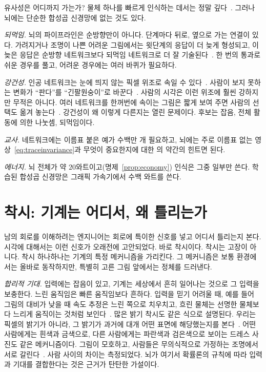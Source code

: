 유사성은 어디까지 가는가? 물체 하나를 빠르게 인식하는 데서는 정말 깊다~\cite{Yamins2014}. 그러나 뇌에는 단순한 합성곱 신경망에 없는 것도 있다.

\emph{되먹임.} 뇌의 파이프라인은 순방향만이 아니다. 단계마다 뒤로, 옆으로 가는 연결이 있다. 가려지거나 조명이 나쁜 어려운 그림에서는 윗단계의 응답이 더 늦게 형성되고, 이 늦은 응답은 순방향 네트워크보다 되먹임 네트워크로 더 잘 기술된다~\cite{Kar2019}. 한 번의 통과로 쉬운 경우를 풀고, 어려운 경우에는 여러 바퀴가 필요하다.

\emph{강건성.} 인공 네트워크는 눈에 띄지 않는 픽셀 위조로 속일 수 있다~\cite{Szegedy2014}. 사람이 보지 못하는 변화가 “판다”를 “긴팔원숭이”로 바꾼다~\cite{Goodfellow2015}. 사람의 시각은 이런 위조에 훨씬 강하지만 무적은 아니다. 여러 네트워크를 한꺼번에 속이는 그림은 짧게 보여 주면 사람의 선택도 옮겨 놓는다~\cite{Elsayed2018}. 강건성이 왜 이렇게 다른지는 열린 문제이다. 후보는 잡음, 전체 활동에 의한 나눗셈, 되먹임이다.

\emph{교사.} 네트워크에는 이름표 붙은 예가 수백만 개 필요하고, 뇌에는 주로 이름표 없는 영상~\eqref{eq:traceinvariance}과 무엇이 중요한지에 대한 의 약간의 힌트면 된다.

\emph{에너지.} 뇌 전체가 약 $20$와트이고(명제~\ref{prop:economy}) 인식은 그중 일부만 쓴다. 학습된 합성곱 신경망은 그래픽 가속기에서 수백 와트를 쓴다.

\section{착시: 기계는 어디서, 왜 틀리는가}
\label{sec:illusions}

남의 회로를 이해하려는 엔지니어는 회로에 특이한 신호를 넣고 어디서 틀리는지 본다. 시각에 대해서는 이런 신호가 오래전에 고안되었다. 바로 착시이다. 착시는 고장이 아니다. 착시 하나하나는 기계의 특정 메커니즘을 가리킨다. 그 메커니즘은 보통 환경에서는 올바로 동작하지만, 특별히 고른 그림 앞에서는 정체를 드러낸다.

\emph{합리적 기대.} 입력에는 잡음이 있고, 기계는 세상에서 흔히 일어나는 것으로 그 입력을 보충한다. 느린 움직임은 빠른 움직임보다 흔하다. 입력을 믿기 어려울 때, 예를 들어 그림의 대비가 낮을 때 속도 추정은 느린 쪽으로 치우치고, 흐린 물체는 선명한 물체보다 느리게 움직이는 것처럼 보인다~\cite{Weiss2002}. 많은 밝기 착시도 같은 식으로 설명된다. 우리는 픽셀의 밝기가 아니라, 그 밝기가 과거에 대개 어떤 표면에 해당했는지를 본다~\cite{Purves2011}. 어떤 사람에게는 흰색과 금색으로, 다른 사람에게는 파란색과 검은색으로 보이는 드레스 사진도 같은 메커니즘이다. 그림이 모호하고, 사람들은 무의식적으로 가정하는 조명에서 서로 갈린다~\cite{LaferSousa2015,Wallisch2017}. 사람 사이의 차이는 측정되었다. 뇌가 여기서 확률론의 규칙에 따라 입력과 기대를 결합한다는 것은 근거가 탄탄한 가설이다.

